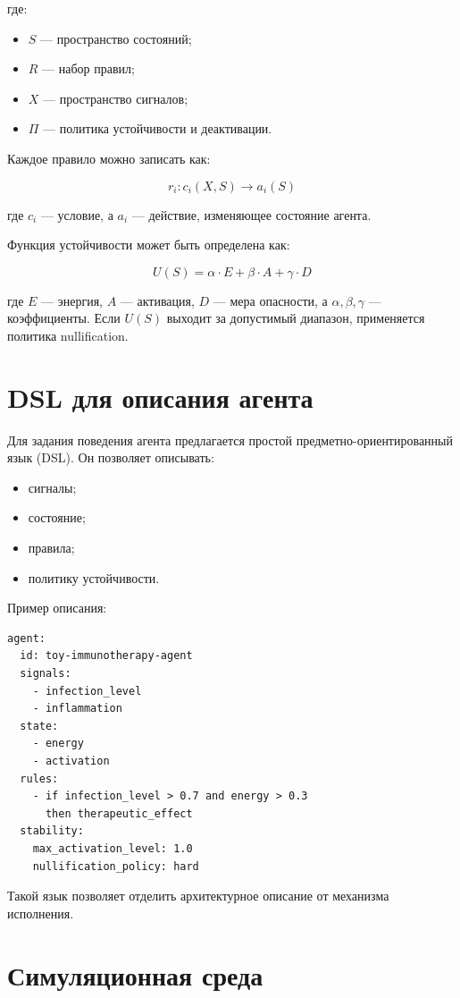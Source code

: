 \documentclass[12pt,a4paper]{article}
\begin{document}
где:
\begin{itemize}
    \item $S$ --- пространство состояний;
    \item $R$ --- набор правил;
    \item $X$ --- пространство сигналов;
    \item $\Pi$ --- политика устойчивости и деактивации.
\end{itemize}

Каждое правило можно записать как:

\[
r_i : c_i(X,S) \rightarrow a_i(S)
\]

где $c_i$ --- условие, а $a_i$ --- действие, изменяющее состояние агента.

Функция устойчивости может быть определена как:

\[
U(S) = \alpha \cdot E + \beta \cdot A + \gamma \cdot D
\]

где $E$ --- энергия, $A$ --- активация, $D$ --- мера опасности, а $\alpha, \beta, \gamma$ --- коэффициенты. Если $U(S)$ выходит за допустимый диапазон, применяется политика nullification.

\section{DSL для описания агента}

Для задания поведения агента предлагается простой предметно-ориентированный язык (DSL). Он позволяет описывать:
\begin{itemize}
    \item сигналы;
    \item состояние;
    \item правила;
    \item политику устойчивости.
\end{itemize}

Пример описания:

\begin{verbatim}
agent:
  id: toy-immunotherapy-agent
  signals:
    - infection_level
    - inflammation
  state:
    - energy
    - activation
  rules:
    - if infection_level > 0.7 and energy > 0.3
      then therapeutic_effect
  stability:
    max_activation_level: 1.0
    nullification_policy: hard
\end{verbatim}

Такой язык позволяет отделить архитектурное описание от механизма исполнения.

\section{Симуляционная среда}
\end{document}
